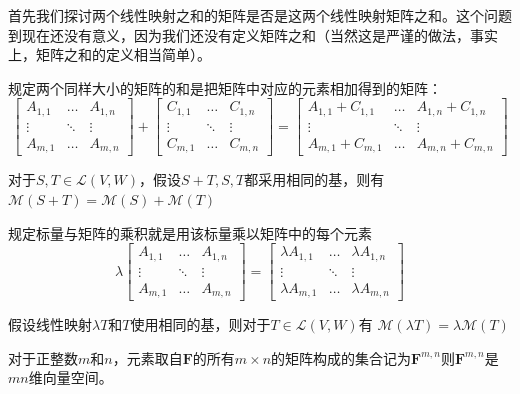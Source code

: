 \documentclass[10pt,a4paper,UTF8]{article}
\begin{document}
首先我们探讨两个线性映射之和的矩阵是否是这两个线性映射矩阵之和。这个问题到现在还没有意义，因为我们还没有定义矩阵之和（当然这是严谨的做法，事实上，矩阵之和的定义相当简单）。
\begin{definition}
规定两个同样大小的矩阵的和是把矩阵中对应的元素相加得到的矩阵：
\begin{equation}
\label{eq:4}
\begin{bmatrix}
A_{1,1} & \ldots & A_{1,n} \\
\vdots  & \ddots & \vdots \\
A_{m,1} & \ldots & A_{m,n}
\end{bmatrix}
+ 
\begin{bmatrix}
C_{1,1} & \ldots & C_{1,n} \\
\vdots  & \ddots & \vdots \\
C_{m,1} & \ldots & C_{m,n}
\end{bmatrix}
= 
\begin{bmatrix}
A_{1,1} + C_{1,1} & \ldots & A_{1,n} + C_{1,n} \\
\vdots  & \ddots & \vdots \\
A_{m,1} + C_{m,1} & \ldots & A_{m,n} + C_{m,n}
\end{bmatrix}
\end{equation}
\end{definition}
对于\(S,T\in \mathcal{L}(V,W)\)，假设\(S+T,S,T\)都采用相同的基，则有\(\mathcal{M}(S+T) = \mathcal{M}(S) + \mathcal{M}(T)\) 

\begin{definition}
规定标量与矩阵的乘积就是用该标量乘以矩阵中的每个元素
\begin{equation}
\label{eq:5}
\lambda
\begin{bmatrix}
A_{1,1} & \ldots & A_{1,n} \\
\vdots  & \ddots & \vdots \\
A_{m,1} & \ldots & A_{m,n}
\end{bmatrix}
= 
\begin{bmatrix}
\lambda A_{1,1}  & \ldots & \lambda A_{1,n}  \\
\vdots  & \ddots & \vdots \\
\lambda A_{m,1} & \ldots & \lambda A_{m,n}
\end{bmatrix}
\end{equation}
\end{definition}
假设线性映射\(\lambda T\)和\(T\)使用相同的基，则对于\(T\in \mathcal{L}(V,W)\)有 \(\mathcal{M}(\lambda T) = \lambda \mathcal{M}(T)\)

对于正整数\(m\)和\(n\)，元素取自\(\mathbf{F}\)的所有\(m\times n\)的矩阵构成的集合记为\(\mathbf{F}^{m,n}\)则\(\mathbf{F}^{m,n}\)是\(mn\)维向量空间。
\end{document}
